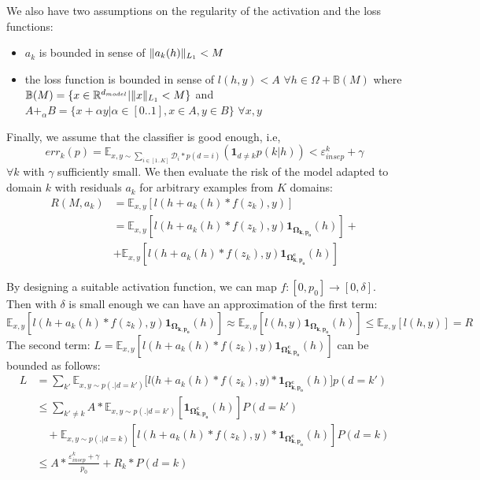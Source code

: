 \documentclass[12pt,a4paper,twoside]{report}
\theoremstyle{definition}
\newcommand{\fyTodo}[1]{\Todo[FY:]{\textcolor{orange}{#1}}}
\begin{document}
We also have two assumptions on the regularity of the activation and the loss functions:
\begin{itemize}
\item $a_k$ is bounded in sense of $\normL{a_k(h)} < M$
\item the loss function is bounded in sense of $l(h,y) < A$ $\forall h \in \Omega + \mathbb{B}(M)$ where $\mathbb{B}(M)=\lbrace x\in \mathbb{R}^{d_{model}} | \normL{x}<M \rbrace$ and $A+_{\alpha}B = \lbrace x+ \alpha y  | \alpha \in [0..1], x \in A, y \in B \rbrace$  \fyTodo{why not $l(h,y) < A$ ?}
  $\forall x,y$
\end{itemize}

Finally, we assume that the classifier is good enough, i.e, $$err_k(p) = \mathbb{E}_{x,y \sim \sum_{i\in [1..K]} \mathcal{D}_{i}*p(d=i)}(\mathbf{1}_{d\neq k} p(k|h)) < \varepsilon_{insep}^k + \gamma$$ $\forall k$ with $\gamma$ sufficiently small.
We then evaluate the risk of the model adapted to domain $k$ with residuals $a_k$ for arbitrary examples from $K$ domains:
\begin{equation}
\begin{split}
  R(M,a_k) &= \mathbb{E}_{x,y}[l(h + a_k(h) * f(z_k),y)] \\
  &= \mathbb{E}_{x,y}[l(h + a_k(h) * f(z_k),y)\mathbf{1}_{\mathbf{\Omega_{k,p_{0}}}}(h)] + \\
  &+ \mathbb{E}_{x,y}[l(h + a_k(h) * f(z_k),y) \mathbf{1}_{\mathbf{\Omega_{k,p_{0}}^{c}}}(h)]
\end{split}
\end{equation}

By designing a suitable activation function, we can map $f: [0,p_{0}] \rightarrow [0,\delta]$. Then with $\delta$ is small enough we can have an approximation of the first term:
\begin{equation}
\mathbb{E}_{x,y}[l(h + a_k(h) * f(z_k),y)\mathbf{1}_{\mathbf{\Omega_{k,p_{0}}}}(h)] \approx{} \mathbb{E}_{x,y}[l(h,y)\mathbf{1}_\mathbf{\Omega_{k,p_{0}}}(h)] \leq \mathbb{E}_{x,y}[l(h,y)] = R
\label{eq:4}
\end{equation}
The second term: $ L = \mathbb{E}_{x,y}[l(h + a_k(h) * f(z_k),y) \mathbf{1}_{\mathbf{\Omega_{k,p_{0}}^{c}}}(h)]$ can be bounded as follows:
\begin{equation*}
\begin{split}
L &= \displaystyle{\mathop{\sum}_{k'}\mathbb{E}_{x,y \sim p(.|d=k')}[l(h } + a_k(h) * f(z_k),y) * \mathbf{1}_{\mathbf{\Omega_{k,p_{0}}^{c}}}(h)]p(d=k') \\
	& \leq \displaystyle{\mathop{\sum}_{k' \neq k}} A * \mathbb{E}_{x,y \sim p(.|d=k')} [\mathbf{1}_{\mathbf{\Omega_{k,p_{0}}^{c}}}(h)]P(d=k') \\
	& \quad + \mathbb{E}_{x,y \sim p(.|d=k)}[l(h + a_k(h) * f(z_k),y) * \mathbf{1}_{\mathbf{\Omega_{k,p_{0}}^{c}}}(h)]P(d=k) \\
	&\leq A * \frac{\mathbb{\varepsilon}_{insep}^k + \gamma}{p_{0}} + R_k * P(d=k)
\end{split}
\label{eq:5}
\end{equation*}
\end{document}
